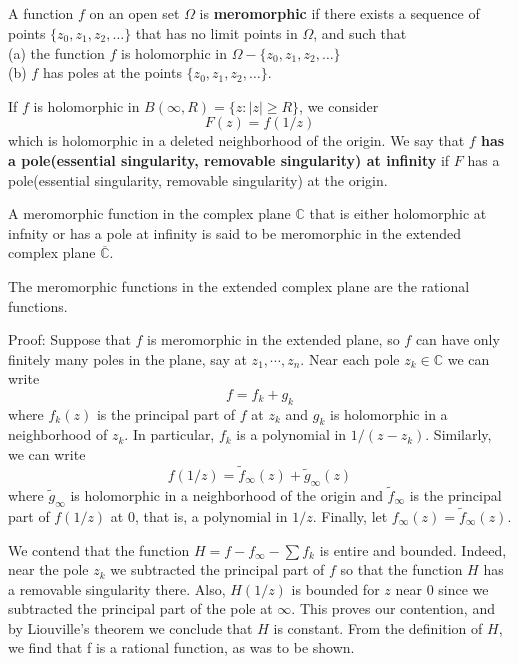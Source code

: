 \documentclass[12pt, oneside]{book}
\begin{document}
\subsection{}
\begin{definition}
    A function $f$ on an open set $\Omega$ is \textbf{meromorphic} if there exists a sequence of points $\{z_0,z_1,z_2,\ldots\}$ that has no limit points in $\Omega$, and such that\\
    (a) the function $f$ is holomorphic in $\Omega-\{z_0,z_1,z_2,\ldots\}$ \\
    (b) $f$ has poles at the points $\{z_0,z_1,z_2,\ldots\}$.
\end{definition}
\begin{definition}
    If $f$ is holomorphic in $B(\infty,R)=\{z:\left|z\right|\geq R\}$, we consider
    $$F(z)=f(1/z)$$
    which is holomorphic in a deleted neighborhood of the origin. We say that \textbf{$f$ has a pole(essential singularity, removable singularity) at infinity} if $F$ has a pole(essential singularity, removable singularity) at the origin.
\end{definition}
\begin{definition}
    A meromorphic function in the complex plane $\mathbb{C}$ that is either holomorphic at infnity or has a pole at infinity is said to be meromorphic in the extended complex plane $\overline{\mathbb{C}}$.
\end{definition}
\begin{theorem}
    The meromorphic functions in the extended complex plane
    are the rational functions.

    Proof: Suppose that $f$ is meromorphic in the extended plane, so $f$ can have only finitely many poles in the plane, say at $z_1,\cdots,z_n$. Near each pole $z_k\in \mathbb{C}$ we can write
    $$f=f_k+g_k$$
    where $f_k(z)$ is the principal part of $f$ at $z_k$ and $g_k$ is holomorphic in a neighborhood of $z_k$. In particular, $f_k$ is a polynomial in $1/(z-z_k)$. Similarly, we can write
    $$f(1/z)=\tilde{f}_\infty(z)+\tilde{g}_\infty(z)$$
    where $\tilde{g}_\infty$ is holomorphic in a neighborhood of the origin and $\tilde{f}_\infty$ is the principal part of $f(1/z)$ at $0$, that is, a polynomial in $1/z$. Finally, let $f_\infty(z)=\tilde{f}_\infty(z)$.

    We contend that the function $H=f-f_\infty-\sum f_k$ is entire and bounded. Indeed, near the pole $z_k$ we subtracted the principal part of $f$ so that the function $H$ has a removable singularity there. Also, $H(1/z)$ is bounded for $z$ near $0$ since we subtracted the principal part of the pole at $\infty$. This proves our contention, and by Liouville's theorem we
    conclude that $H$ is constant. From the definition of $H$, we find that f is a rational function, as was to be shown.
\end{theorem}
\end{document}
